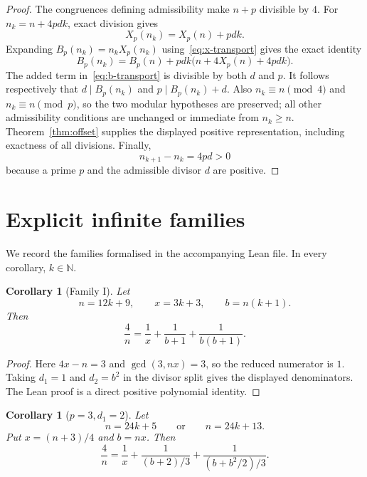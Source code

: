 \documentclass[11pt]{article}
\newtheorem{corollary}[theorem]{Corollary}
\theoremstyle{remark}
\newcommand{\N}{\mathbb{N}}
\begin{document}
\begin{proof}
The congruences defining admissibility make \(n+p\) divisible by \(4\).
For \(n_k=n+4pdk\), exact division gives
\begin{equation}\label{eq:x-transport}
  X_p(n_k)=X_p(n)+pdk.
\end{equation}
Expanding \(B_p(n_k)=n_k X_p(n_k)\) using~\eqref{eq:x-transport} gives the exact
identity
\begin{equation}\label{eq:b-transport}
  B_p(n_k)
  =
  B_p(n)+pdk\bigl(n+4X_p(n)+4pdk\bigr).
\end{equation}
The added term in~\eqref{eq:b-transport} is divisible by both \(d\) and \(p\).
It follows respectively that \(d\mid B_p(n_k)\) and
\(p\mid B_p(n_k)+d\).  Also \(n_k\equiv n\pmod4\) and
\(n_k\equiv n\pmod p\), so the two modular hypotheses are preserved; all other
admissibility conditions are unchanged or immediate from \(n_k\ge n\).
Theorem~\ref{thm:offset} supplies the displayed positive representation,
including exactness of all divisions.  Finally,
\[
  n_{k+1}-n_k=4pd>0
\]
because a prime \(p\) and the admissible divisor \(d\) are positive.
\end{proof}

\section{Explicit infinite families}

We record the families formalised in the accompanying Lean file.  In every
corollary, \(k\in\N\).

\begin{corollary}[Family I]\label{cor:family-I}
Let
\[
  n=12k+9,\qquad x=3k+3,\qquad b=n(k+1).
\]
Then
\[
  \frac4n=\frac1x+\frac1{b+1}+\frac1{b(b+1)}.
\]
\end{corollary}

\begin{proof}
Here \(4x-n=3\) and \(\gcd(3,nx)=3\), so the reduced numerator is \(1\).
Taking \(d_1=1\) and \(d_2=b^2\) in the divisor split gives the displayed
denominators.  The Lean proof is a direct positive polynomial identity.
\end{proof}

\begin{corollary}[\(p=3,d_1=2\)]\label{cor:d2}
Let
\[
  n=24k+5\qquad\text{or}\qquad n=24k+13.
\]
Put \(x=(n+3)/4\) and \(b=nx\).  Then
\[
  \frac4n
  =\frac1x
   +\frac1{(b+2)/3}
   +\frac1{(b+b^2/2)/3}.
\]
\end{corollary}
\end{document}
